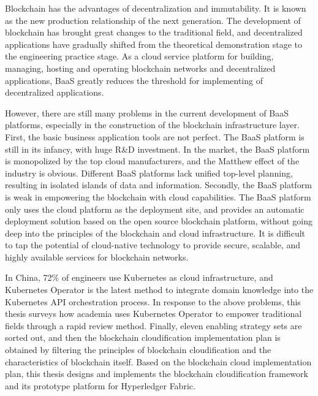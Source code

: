 \documentclass[macfonts,master,oneside]{njuthesis}
\begin{document}
\begin{englishabstract}
  Blockchain has the advantages of decentralization and immutability. It is known as the new production relationship of the next generation. The development of blockchain has brought great changes to the traditional field, and decentralized applications have gradually shifted from the theoretical demonstration stage to the engineering practice stage. As a cloud service platform for building, managing, hosting and operating blockchain networks and decentralized applications, BaaS greatly reduces the threshold for implementing of decentralized applications.

  However, there are still many problems in the current development of BaaS platforms, especially in the construction of the blockchain infrastructure layer. First, the basic business application tools are not perfect. The BaaS platform is still in its infancy, with huge R\&D investment. In the market, the BaaS platform is monopolized by the top cloud manufacturers, and the Matthew effect of the industry is obvious. Different BaaS platforms lack unified top-level planning, resulting in isolated islands of data and information. Secondly, the BaaS platform is weak in empowering the blockchain with cloud capabilities. The BaaS platform only uses the cloud platform as the deployment site, and provides an automatic deployment solution based on the open source blockchain platform, without going deep into the principles of the blockchain and cloud infrastructure. It is difficult to tap the potential of cloud-native technology to provide secure, scalable, and highly available services for blockchain networks.

  In China, 72\% of engineers use Kubernetes as cloud infrastructure, and Kubernetes Operator is the latest method to integrate domain knowledge into the Kubernetes API orchestration process. In response to the above problems, this thesis surveys how academia uses Kubernetes Operator to empower traditional fields through a rapid review method. Finally, eleven enabling strategy sets are sorted out, and then the blockchain cloudification implementation plan is obtained by filtering the principles of blockchain cloudification and the characteristics of blockchain itself. Based on the blockchain cloud implementation plan, this thesis designs and implements the blockchain cloudification framework and its prototype platform for Hyperledger Fabric.


\end{englishabstract}
\end{document}
